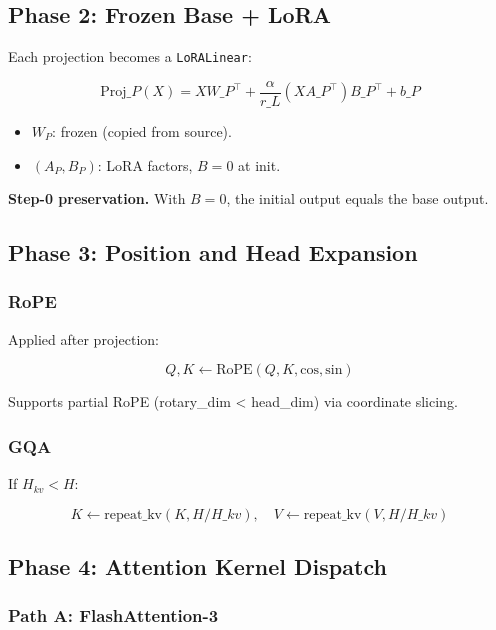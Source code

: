 \subsection{Phase 2: Frozen Base + LoRA}

Each projection becomes a \texttt{LoRALinear}:

\[
\text{Proj}\_P(X) = X W\_P^\top + \frac{\alpha}{r\_L} (X A\_P^\top) B\_P^\top + b\_P
\tag{4.1}
\]

\begin{itemize}
\item $W_P$: frozen (copied from source).
\item $(A_P, B_P)$: LoRA factors, $B = 0$ at init.

\end{itemize}
\textbf{Step-0 preservation.} With $B = 0$, the initial output equals the base 
output.

\subsection{Phase 3: Position and Head Expansion}

\subsubsection{RoPE}

Applied after projection:

\[
Q, K \leftarrow \text{RoPE}(Q, K, \text{cos}, \text{sin})
\tag{4.2}
\]

Supports partial RoPE (rotary\_dim \textless{} head\_dim) via coordinate slicing.

\subsubsection{GQA}

If $H_{kv} < H$:

\[
K \leftarrow \text{repeat\_kv}(K, H/H\_{kv}), \quad
V \leftarrow \text{repeat\_kv}(V, H/H\_{kv})
\tag{4.3}
\]

\subsection{Phase 4: Attention Kernel Dispatch}

\subsubsection{Path A: FlashAttention-3}

